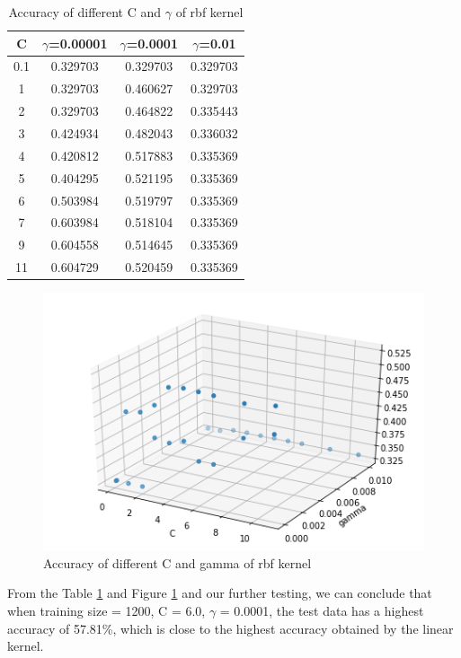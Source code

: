 \begin{table}[h!]
\centering
\begin{tabular}{||c| c | c | c||} 
 \hline
 \textbf{C} & \textbf{$\gamma$=0.00001} & \textbf{$\gamma$=0.0001} & \textbf{$\gamma$=0.01} \\ [0.5ex] 
 \hline\hline
0.1 & 0.329703 & 0.329703 & 0.329703\\\hline
1 & 0.329703 & 0.460627 & 0.329703\\\hline
2 & 0.329703 & 0.464822	& 0.335443\\\hline
3 & 0.424934 & 0.482043	& 0.336032\\\hline
4 & 0.420812 & 0.517883	& 0.335369\\\hline
5 & 0.404295 & 0.521195	& 0.335369\\\hline
6 & 0.503984 & 0.519797 & 0.335369\\\hline
7 & 0.603984 & 0.518104	& 0.335369\\\hline
9 & 0.604558 & 0.514645	& 0.335369\\\hline
11 & 0.604729& 0.520459 & 0.335369\\[1ex] 
 \hline
\end{tabular}
\caption{Accuracy of different C and $\gamma$ of rbf kernel}
\label{table:Accuracy of different C and gamma of rbf kernel}
\end{table}

\begin{figure}[h!]
    \centering
    \includegraphics[scale=0.4]{figures/Accuracy of different C and gamma of rbf kernel.png}
    \caption{Accuracy of different C and gamma of rbf kernel}
    \label{fig:Accuracy of different C and gamma of rbf kernel}
\end{figure}

From the Table \ref{table:Accuracy of different C and gamma of rbf kernel} and Figure \ref{fig:Accuracy of different C and gamma of rbf kernel} and our further testing, we can conclude that when training size = 1200,  C = 6.0, $\gamma$ = 0.0001, the test data has a highest accuracy of 57.81\%, which is close to the highest accuracy obtained by the linear kernel.

